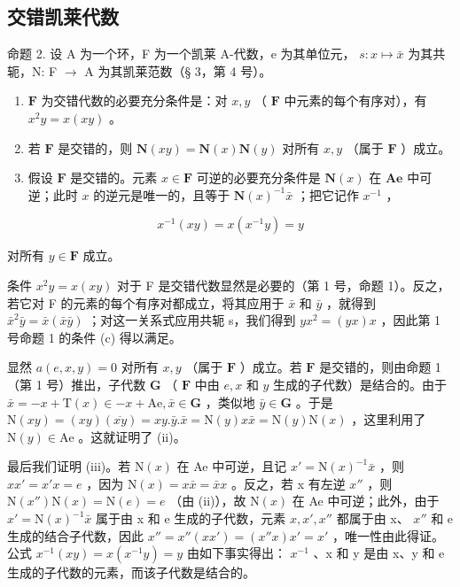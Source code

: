 \subsection{交错凯莱代数}

命题 2. 设 A 为一个环，F 为一个凯莱 A-代数，e 为其单位元， \(s: x \mapsto \bar{x}\) 为其共轭，N: F \(\to\) A 为其凯莱范数（§ 3，第 4 号）。

\begin{enumerate}
\def\labelenumi{(\roman{enumi})}
\item
  \(\mathbf{F}\) 为交错代数的必要充分条件是：对 \(x, y\) （ \(\mathbf{F}\) 中元素的每个有序对），有 \(x^2y = x(xy)\) 。
\item
  若 \(\mathbf{F}\) 是交错的，则 \(\mathbf{N}(xy) = \mathbf{N}(x)\mathbf{N}(y)\) 对所有 \(x,y\) （属于 \(\mathbf{F}\) ）成立。
\item
  假设 \(\mathbf{F}\) 是交错的。元素 \(x \in \mathbf{F}\) 可逆的必要充分条件是 \(\mathbf{N}(x)\) 在 \(\mathbf{Ae}\) 中可逆；此时 \(x\) 的逆元是唯一的，且等于 \(\mathbf{N}(x)^{-1}\bar{x}\) ；把它记作 \(x^{-1}\) ，
\end{enumerate}

\[
x ^ {- 1} (x y) = x \left(x ^ {- 1} y\right) = y
\]

对所有 \(y \in \mathbf{F}\) 成立。

条件 \(x^{2}y = x(xy)\) 对于 F 是交错代数显然是必要的（第 1 号，命题 1）。反之，若它对 F 的元素的每个有序对都成立，将其应用于 \(\bar{x}\) 和 \(\bar{y}\) ，就得到 \(\bar{x}^{2}\bar{y} = \bar{x}(\bar{x}\bar{y})\) ；对这一关系式应用共轭 s，我们得到 \(yx^{2} = (yx)x\) ，因此第 1 号命题 1 的条件 (c) 得以满足。

显然 \(a(e, x, y) = 0\) 对所有 \(x, y\) （属于 \(\mathbf{F}\) ）成立。若 \(\mathbf{F}\) 是交错的，则由命题 1（第 1 号）推出，子代数 \(\mathbf{G}\) （ \(\mathbf{F}\) 中由 \(e, x\) 和 \(y\) 生成的子代数）是结合的。由于 \(\bar{x} = -x + \mathrm{T}(x) \in -x + \mathrm{Ae}, \bar{x} \in \mathbf{G}\) ，类似地 \(\bar{y} \in \mathbf{G}\) 。于是 \(\mathrm{N}(xy) = (xy)(\overline{xy}) = xy.\bar{y}.\bar{x} = \mathrm{N}(y)x\bar{x} = \mathrm{N}(y)\mathrm{N}(x)\) ，这里利用了 \(\mathrm{N}(y) \in \mathrm{Ae}\) 。这就证明了 (ii)。

最后我们证明 (iii)。若 \(\mathrm{N}(x)\) 在 Ae 中可逆，且记 \(x' = \mathrm{N}(x)^{-1}\bar{x}\) ，则 \(xx' = x'x = e\) ，因为 \(\mathrm{N}(x) = x\bar{x} = \bar{x}x\) 。反之，若 x 有左逆 \(x''\) ，则 \(\mathrm{N}(x'')\mathrm{N}(x) = \mathrm{N}(e) = e\) （由 (ii)），故 \(\mathrm{N}(x)\) 在 Ae 中可逆；此外，由于 \(x' = \mathrm{N}(x)^{-1}\bar{x}\) 属于由 x 和 e 生成的子代数，元素 \(x, x', x''\) 都属于由 x、 \(x''\) 和 e 生成的结合子代数，因此 \(x'' = x''(xx') = (x''x)x' = x'\) ，唯一性由此得证。公式 \(x^{-1}(xy) = x(x^{-1}y) = y\) 由如下事实得出： \(x^{-1}\) 、x 和 y 是由 x、y 和 e 生成的子代数的元素，而该子代数是结合的。

